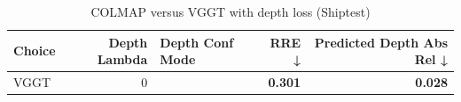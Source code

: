 \begin{table}[H]
\caption{COLMAP versus VGGT with depth loss (Shiptest)}
\label{tab:05_depth_lambda_shiptest}
\begin{tabular}{lrlrr}
\toprule
Choice & Depth Lambda & Depth Conf Mode & RRE ↓ & Predicted Depth Abs Rel ↓ \\
\midrule
VGGT & 0 &  & \textbf{0.301} & \textbf{0.028} \\
\bottomrule
\end{tabular}
\end{table}
